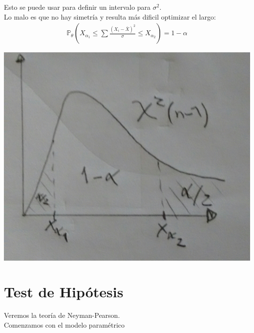 \documentclass[10pt]{article}
\theoremstyle{plain}
\theoremstyle{definition}
\begin{document}
 Esto se puede usar para definir un intervalo para $\sigma^2$.\\
 Lo malo es que no hay simetría y resulta más dificil optimizar el largo:
 \begin{align*}
 \mathbb{P}_{\theta}(X_{\alpha_{1}}\le \sum {\frac{(X_{i}-\bar{X})^2}{\sigma}} \le X_{\alpha_{2}}) = 1-\alpha
 \end{align*}
 \begin{center}
 \includegraphics[scale=0.2]{imagenes/distr3.jpg}
 \end{center}
 \section{Test de Hipótesis}
 Veremos la teoría de Neyman-Pearson.\\
 
 Comenzamos con el modelo paramétrico
\end{document}
